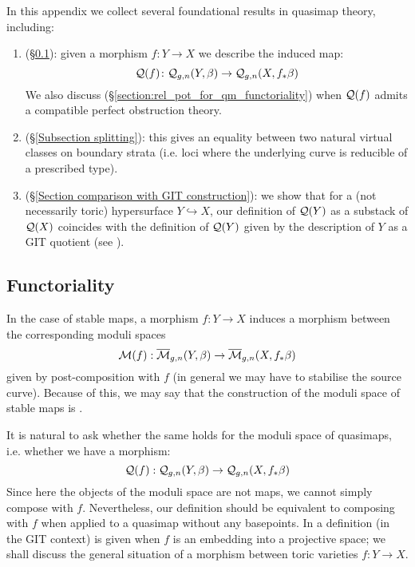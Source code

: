 In this appendix we collect several foundational results in quasimap theory, including:
\begin{enumerate}
\item {} (\S \ref{Functoriality of Quasimap Spaces Section}): given a morphism $f\colon Y\to X$ we describe the induced map:
\begin{equation*} \mathcal{Q}(f)\colon\mathcal{Q}_{g,n}(Y,\beta)\rightarrow\mathcal{Q}_{g,n}(X,f_*\beta) \end{equation*}
We also discuss (\S \ref{section:rel_pot_for_qm_functoriality}) when $\mathcal{Q}(f)$ admits a compatible perfect obstruction theory.
\item {} (\S \ref{Subsection splitting}): this gives an equality between two natural virtual classes on boundary strata (i.e. loci where the underlying curve is reducible of a prescribed type).
\item {} (\S \ref{Section comparison with GIT construction}): we show that for a (not necessarily toric) hypersurface $Y \hookrightarrow X$, our definition of $\mathcal{Q}(Y)$ as a substack of $\mathcal{Q}(X)$ coincides with the definition of $\mathcal{Q}(Y)$ given by the description of $Y$ as a GIT quotient (see \cite{CFKM}).
\end{enumerate}

\subsection{Functoriality} \label{Functoriality of Quasimap Spaces Section}

In the case of stable maps, a morphism $f : Y \to X$ induces a morphism between the corresponding moduli spaces
\begin{equation*}\mathcal{M}(f) : \overline{\mathcal{M}}_{g,n}(Y,\beta) \rightarrow \overline{\mathcal{M}}_{g,n}(X,f_* \beta) \end{equation*}
given by post-composition with $f$ (in general we may have to stabilise the source curve). Because of this, we may say that the construction of the moduli space of stable maps is .

It is natural to ask whether the same holds for the moduli space of quasimaps, i.e. whether we have a morphism:
\begin{equation*} \mathcal{Q}(f) : \mathcal{Q}_{g,n}(Y,\beta) \rightarrow \mathcal{Q}_{g,n}(X,f_* \beta) \end{equation*}
Since here the objects of the moduli space are not maps, we cannot simply compose with $f$. Nevertheless, our definition should be equivalent to composing with $f$ when applied to a quasimap without any basepoints. In \cite[Section 3.1]{CF-K-wallcrossing} a definition (in the GIT context) is given when $f$ is an embedding into a projective space; we shall discuss the general situation of a morphism between toric varieties $f\colon Y\to X$.

